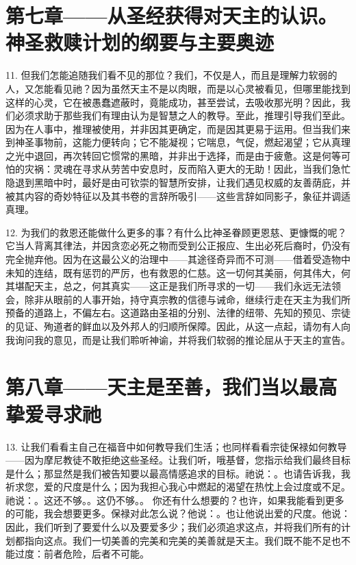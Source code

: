 
\section{第七章——从圣经获得对天主的认识。神圣救赎计划的纲要与主要奥迹}

11. 但我们怎能追随我们看不见的那位？我们，不仅是人，而且是理解力软弱的人，又怎能看见祂？因为虽然天主不是以肉眼，而是以心灵被看见，但哪里能找到这样的心灵，它在被愚蠢遮蔽时，竟能成功，甚至尝试，去吸收那光明？因此，我们必须求助于那些我们有理由认为是智慧之人的教导。至此，推理引导我们至此。因为在人事中，推理被使用，并非因其更确定，而是因其更易于运用。但当我们来到神圣事物前，这能力便转向；它不能凝视；它喘息，气促，燃起渴望；它从真理之光中退回，再次转回它惯常的黑暗，并非出于选择，而是由于疲惫。这是何等可怕的灾祸：灵魂在寻求从劳苦中安息时，反而陷入更大的无助！因此，当我们急忙隐退到黑暗中时，最好是由可钦崇的智慧所安排，让我们遇见权威的友善荫庇，并被其内容的奇妙特征以及其书卷的言辞所吸引——这些言辞如同影子，象征并调适真理。\par

12. 为我们的救恩还能做什么更多的事？有什么比神圣眷顾更恩慈、更慷慨的呢？它当人背离其律法，并因贪恋必死之物而受到公正报应、生出必死后裔时，仍没有完全抛弃他。因为在这最公义的治理中——其途径奇异而不可测——借着受造物中未知的连结，既有惩罚的严厉，也有救恩的仁慈。这一切何其美丽，何其伟大，何其堪配天主，总之，何其真实——这正是我们所寻求的一切——我们永远无法领会，除非从眼前的人事开始，持守真宗教的信德与诫命，继续行走在天主为我们所预备的道路上，不偏左右。这道路由圣祖的分别、法律的纽带、先知的预见、宗徒的见证、殉道者的鲜血以及外邦人的归顺所保障。因此，从这一点起，请勿有人向我询问我的意见，而是让我们聆听神谕，并将我们软弱的推论屈从于天主的宣告。\par


\section{第八章——天主是至善，我们当以最高挚爱寻求祂}

13. 让我们看看主自己在福音中如何教导我们生活；也同样看看宗徒保禄如何教导——因为摩尼教徒不敢拒绝这些圣经。让我们听，哦基督，您指示给我们最终目标是什么；那显然是我们被告知要以最高情感追求的目标。祂说：。也请告诉我，我祈求您，爱的尺度是什么；因为我担心我心中燃起的渴望在热忱上会过度或不足。祂说：。这还不够。。这仍不够。。 你还有什么想要的？也许，如果我能看到更多的可能，我会想要更多。保禄对此怎么说？他说：。也让他说出爱的尺度。他说： 因此，我们听到了要爱什么以及要爱多少；我们必须追求这点，并将我们所有的计划都指向这点。我们一切美善的完美和完美的美善就是天主。我们既不能不足也不能过度：前者危险，后者不可能。\par

